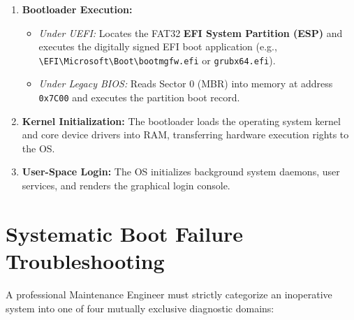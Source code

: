 \begin{enumerate}[label=\bfseries\arabic*.]
    \item \textbf{Bootloader Execution:}
    \begin{itemize}
        \item \textit{Under UEFI:} Locates the FAT32 \textbf{EFI System Partition (ESP)} and executes the digitally signed EFI boot application (e.g., \texttt{\textbackslash EFI\textbackslash Microsoft\textbackslash Boot\textbackslash bootmgfw.efi} or \texttt{grubx64.efi}).
        \item \textit{Under Legacy BIOS:} Reads Sector 0 (MBR) into memory at address \texttt{0x7C00} and executes the partition boot record.
    \end{itemize}
    \item \textbf{Kernel Initialization:} The bootloader loads the operating system kernel and core device drivers into RAM, transferring hardware execution rights to the OS.
    \item \textbf{User-Space Login:} The OS initializes background system daemons, user services, and renders the graphical login console.
\end{enumerate}


\section{Systematic Boot Failure Troubleshooting}
\label{sec:boot_troubleshooting}

A professional Maintenance Engineer must strictly categorize an inoperative system into one of four mutually exclusive diagnostic domains:

